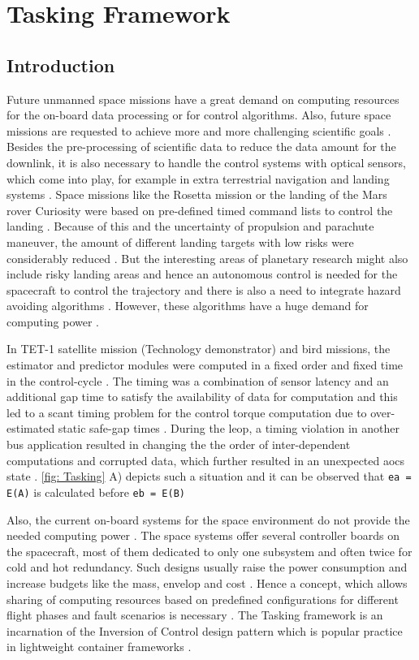 
\chapter{Tasking Framework}
\section{Introduction}
Future unmanned space missions have a great demand on computing resources for the on-board data processing or for control algorithms. Also, future space missions are requested to achieve more and more challenging scientific goals \cite{PhdThesis}. Besides the pre-processing of scientific data to reduce the data amount for the downlink, it is also necessary to handle the control systems with optical sensors, which come into play, for example in extra terrestrial navigation and landing systems \cite{ATON}. Space missions like the Rosetta mission or the landing of the Mars rover Curiosity were based on pre-defined timed command lists to control the landing \cite{TaskFr}. Because of this and the uncertainty of propulsion and parachute maneuver, the amount of different landing targets with low risks were considerably reduced \cite{TaskFr}. But the interesting areas of planetary research might also include risky landing areas and hence an autonomous control is needed for the spacecraft to control the trajectory and there is also a need to integrate hazard avoiding algorithms \cite{ATON}. However, these algorithms have a huge demand for computing power \cite{TaskFr}. 

In TET-1 satellite mission (Technology demonstrator) and \ac{bird} missions, the estimator and predictor modules were computed in a fixed order and fixed time in the control-cycle \cite{TETBIRD}. The timing was a combination of sensor latency and an additional gap time to satisfy the availability of data for computation and this led to a scant timing problem for the control torque computation due to over-estimated static safe-gap times \cite{TETBIRD}\cite{TETtoEUCROPIS}. During the \ac{leop}, a timing violation in another bus application resulted in changing the the order of inter-dependent computations and corrupted data, which further resulted in an unexpected \ac{aocs} state \cite{TETBIRD}. \cref{fig: Tasking} A) depicts such a situation and it can be observed that \texttt{ea = E(A)} is calculated before \texttt{eb = E(B)} 

Also, the current on-board systems for the space environment do not provide the needed computing power \cite{TaskFr}. The space systems offer several controller boards on the spacecraft, most of them dedicated to only one subsystem and often twice for cold and hot redundancy. Such designs usually raise the power consumption and increase budgets like the mass, envelop and cost \cite{TaskFr}. Hence a concept, which allows sharing of computing resources based on predefined configurations for different flight phases and fault scenarios is necessary \cite{TaskFr}. The Tasking framework is an incarnation of the Inversion of Control design pattern which is popular practice in lightweight container frameworks \cite{InvOfCntrlurl}. 

